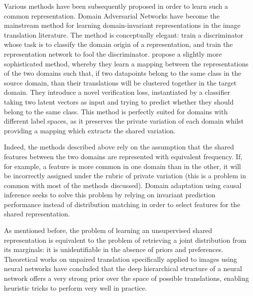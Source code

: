 \documentclass[withindex,glossary,firstyr,times]{cam-thesis}
\begin{document}
Various methods have been subsequently proposed in order to learn such a common representation. Domain Adversarial Networks \cite{ganin2015unsupervised, ganin2016domain} have become the mainstream method for learning domain-invariant representations in the image translation literature. The method is conceptually elegant: train a discriminator \cite{goodfellow2014generative} whose task is to classify the domain origin of a representation, and train the representation network to fool the discriminator. \citet{sohn2018unsupervised} propose a slightly more sophisticated method, whereby they learn a mapping between the representations of the two domains such that, if two datapoints belong to the same class in the source domain, than their translations will be clustered together in the target domain. They introduce a novel verification loss, instantiated by a classifier taking two latent vectors as input and trying to predict whether they should belong to the same class. This method is perfectly suited for domains with different label spaces, as it preserves the private variation of each domain whilst providing a mapping which extracts the shared variation. 

Indeed, the methods described above rely on the assumption that the shared features between the two domains are represented with equivalent frequency. If, for example, a feature is more common in one domain than in the other, it will be incorrectly assigned under the rubric of private variation (this is a problem in common with most of the methods discussed). Domain adaptation using causal inference \cite{magliacane2018domain} seeks to solve this problem by relying on invariant prediction performance instead of distribution matching in order to select features for the shared representation.

As mentioned before, the problem of learning an unsupervised shared representation is equivalent to the problem of retrieving a joint distribution from its marginals: it is unidentifiable in the absence of priors and preferences. Theoretical works on unpaired translation specifically applied to images using neural networks \cite{galanti2018role, galanti2018generalization} have concluded that the deep hierarchical structure of a neural network offers a very strong prior over the space of possible translations, enabling heuristic tricks to perform very well in practice.
\end{document}
